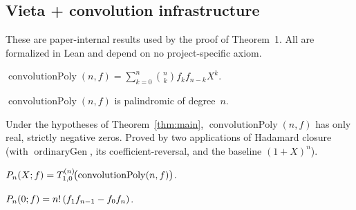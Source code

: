 \subsection{Vieta + convolution infrastructure}

These are paper-internal results used by the proof of Theorem~1.  All
are formalized in Lean and depend on no project-specific axiom.

\begin{lemma}
  \label{lem:convolutionPoly}
  \leanok
  $\operatorname{convolutionPoly}(n,f)
   = \sum_{k=0}^{n} \binom{n}{k} f_k f_{n-k} X^k.$
\end{lemma}

\begin{lemma}
  \label{lem:convolutionPoly_palindromic}
  \leanok
  $\operatorname{convolutionPoly}(n,f)$ is palindromic of degree~$n$.
\end{lemma}

\begin{lemma}
  \label{lem:convolutionPoly_hasOnlyRealNegativeZeros}
  \leanok
  Under the hypotheses of Theorem~\ref{thm:main},
  $\operatorname{convolutionPoly}(n,f)$ has only real, strictly negative
  zeros.  Proved by two applications of Hadamard closure (with
  $\operatorname{ordinaryGen}$, its coefficient-reversal, and the
  baseline $(1+X)^n$).
\end{lemma}

\begin{lemma}
  \label{lem:determinantPolynomial_eq_rungOperator_convolutionPoly}
  \leanok
  $P_n(X; f) = T_{1,0}^{(n)}\!\bigl(\operatorname{convolutionPoly}(n,f)\bigr)$.
\end{lemma}

\begin{lemma}[$\Pn(0)$]
  \label{lem:determinantPolynomial_eval_zero}
  \leanok
  $P_n(0; f) = n!\,(f_1 f_{n-1} - f_0 f_n)$.
\end{lemma}

